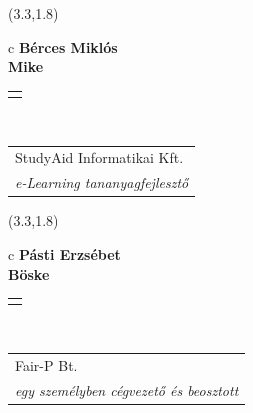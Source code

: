 \documentclass[11pt]{article}
\begin{document}
\makebox(3.3,1.8){
  \renewcommand\arraystretch{1.3}
  \begin{tabular}[c]{c}
    \hspace{8.5mm}
    \LARGE\bf{ Bérces Miklós }\\
    \hspace{8.5mm}
    \Large{ Mike }\\
    \renewcommand\arraystretch{3}
    \begin{tabular}[c]{c}
      \centering
      \fontfamily{phv}\selectfont{
        \textbf{
          \textsc{
            \scriptsize{
            \color{Dark}{ Ismerkedő }\color{Bright}{ Webmester }\color{Bright}{ Sminkmester }\color{Bright}{ Programozó }
            }
          }
        }
      }
    \end{tabular}
    \\
    \renewcommand\arraystretch{1}
    \begin{tabular}{p{3.3in}}
      \hspace{.7cm}StudyAid Informatikai Kft.\\
      \hspace{.7cm}\emph{ e-Learning tananyagfejlesztő }\\
    \end{tabular}
  \end{tabular}
}

\makebox(3.3,1.8){
  \renewcommand\arraystretch{1.3}
  \begin{tabular}[c]{c}
    \hspace{8.5mm}
    \LARGE\bf{ Pásti Erzsébet }\\
    \hspace{8.5mm}
    \Large{ Böske }\\
    \renewcommand\arraystretch{3}
    \begin{tabular}[c]{c}
      \centering
      \fontfamily{phv}\selectfont{
        \textbf{
          \textsc{
            \scriptsize{
            \color{Dark}{ Ismerkedő }\color{Bright}{ Webmester }\color{Bright}{ Sminkmester }\color{Bright}{ Programozó }
            }
          }
        }
      }
    \end{tabular}
    \\
    \renewcommand\arraystretch{1}
    \begin{tabular}{p{3.3in}}
      \hspace{.7cm}Fair-P Bt.\\
      \hspace{.7cm}\emph{ egy személyben cégvezető és beosztott }\\
    \end{tabular}
  \end{tabular}
}
\end{document}
